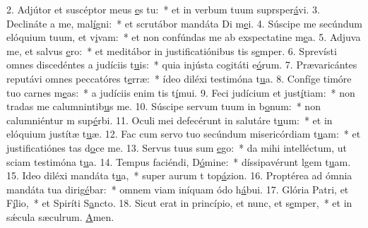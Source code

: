 2. Adjútor et suscéptor meus \uline{e}s tu:~* et in verbum tuum suprsper\uline{á}vi.
3. Declináte a me, mal\uline{í}gni:~* et scrutábor mandáta Di m\uline{e}i.
4. Súscipe me secúndum elóquium tuum, et v\uline{i}vam:~* et non confúndas me ab exspectatine m\uline{e}a.
5. Adjuva me, et salvus \uline{e}ro:~* et meditábor in justificatiónibus tis s\uline{e}mper.
6. Sprevísti omnes discedéntes a judíciis t\uline{u}is:~* quia injústa cogitáti e\uline{ó}rum.
7. Prævaricántes reputávi omnes peccatóres t\uline{e}rræ:~* ídeo diléxi testimóna t\uline{u}a.
8. Confíge timóre tuo carnes m\uline{e}as:~* a judíciis enim tis t\uline{í}mui.
9. Feci judícium et just\uline{í}tiam:~* non tradas me calumnintib\uline{u}s me.
10. Súscipe servum tuum in b\uline{o}num:~* non calumniéntur m sup\uline{é}rbi.
11. Oculi mei defecérunt in salutáre t\uline{u}um:~* et in elóquium justítæ t\uline{u}æ.
12. Fac cum servo tuo secúndum misericórdiam t\uline{u}am:~* et justificatiónes tas d\uline{o}ce me.
13. Servus tuus sum \uline{e}go:~* da mihi intelléctum, ut sciam testimóna t\uline{u}a.
14. Tempus faciéndi, D\uline{ó}mine:~* díssipavérunt lgem t\uline{u}am.
15. Ideo diléxi mandáta t\uline{u}a,~* super aurum t top\uline{á}zion.
16. Proptérea ad ómnia mandáta tua dirig\uline{é}bar:~* omnem viam iníquam ódo h\uline{á}bui.
17. Glória Patri, et F\uline{í}lio,~* et Spiríti S\uline{a}ncto.
18. Sicut erat in princípio, et nunc, et s\uline{e}mper,~* et in sǽcula sæculrum. \uline{A}men.
